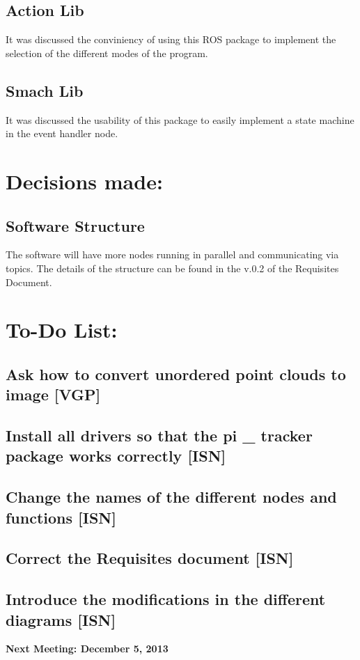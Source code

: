 \documentclass{article}
\newenvironment{myindentpar}[1]%
 {\begin{list}{}%
         {\setlength{\leftmargin}{#1}}%
         \item[]%
 }
 {\end{list}}
\begin{document}
	\subsection{Action Lib}
		\begin{myindentpar}{1cm} 
		It was discussed the conviniency of using this ROS package to implement the selection of the different modes of the program. 
		\end{myindentpar}

	\subsection{Smach Lib}
		\begin{myindentpar}{1cm} 
		It was discussed the usability of this package to easily implement a state machine in the event handler node. 
		\end{myindentpar}


\section{\LARGE Decisions made:}
	\subsection{Software Structure}
		\begin{myindentpar}{1cm} 
		The software will have more nodes running in parallel and communicating via topics. The details of the structure can be found in the v.0.2 of the Requisites Document. 
		\end{myindentpar}
		
	


\section{\LARGE To-Do List: }
	\subsection{Ask how to convert unordered point clouds to image [VGP]}
	
	\subsection{Install all drivers so that the pi \_ tracker package works correctly [ISN]}

	\subsection{Change the names of the different nodes and functions [ISN]}
	
	\subsection{Correct the Requisites document [ISN]}
	\subsection{Introduce the modifications in the different diagrams [ISN]}
	

	


\begin {center}
{\Large \textbf{Next Meeting: December 5, 2013}}
\end{center}
\end{document}
